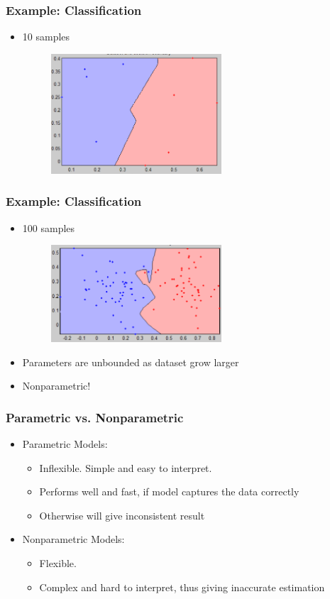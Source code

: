 \documentclass{beamer}
\begin{document}
\begin{frame}
	\frametitle{Example: Classification}
	\begin{itemize}
		\item 10 samples
		\begin{figure}		\includegraphics[width=0.6\textwidth]{img/knn10.png}
		\end{figure}
		
	\end{itemize}
\end{frame}
\begin{frame}
	\frametitle{Example: Classification}
	\begin{itemize}
		\item 100 samples
		\begin{figure}	
		\includegraphics[width=0.6\textwidth]{img/knn100.png}
		\end{figure}
		\item Parameters are unbounded as dataset grow larger
		\item Nonparametric!
	\end{itemize}
\end{frame}

\begin{frame}
	\frametitle{Parametric vs. Nonparametric}
	\begin{itemize}
		\item Parametric Models:
		\begin{itemize}
			\item Inflexible. Simple and easy to interpret.
			\item Performs well and fast, if model captures the data correctly
			\item Otherwise will give inconsistent result
		\end{itemize}
		\item Nonparametric Models:
		\begin{itemize}
			\item Flexible.
			\item Complex and hard to interpret, thus giving inaccurate estimation
		\end{itemize}
	\end{itemize}
\end{frame}
\end{document}
